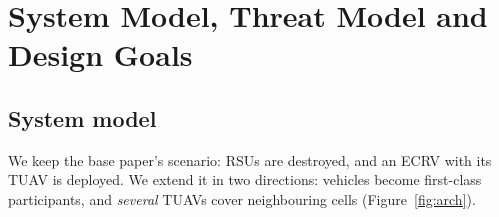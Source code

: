 \chapter{System Model, Threat Model and Design Goals}\label{sec:model}

\section{System model}
We keep the base paper's scenario: RSUs are destroyed, and an ECRV with its TUAV is deployed. We extend it in two directions: vehicles become
first-class participants, and \emph{several} TUAVs cover neighbouring cells (Figure~\ref{fig:arch}).

